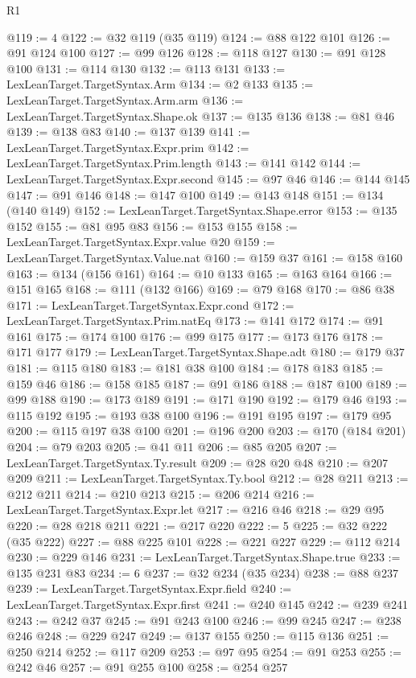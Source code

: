 \begin{lexlean}{R1}
\begin{coremodule}
{{{{{{{{{{{{{{{{{{{{{{{{{{{{{{{{{{{{{{{{{{{{{{{{{{{{{{{{{@119 := 4
@122 := @32 @119 (@35 @119)
@124 := @88 @122 @101
@126 := @91 @124 @100
@127 := @99 @126
@128 := @118 @127
@130 := @91 @128 @100
@131 := @114 @130
@132 := @113 @131
@133 := LexLeanTarget.TargetSyntax.Arm
@134 := @2 @133
@135 := LexLeanTarget.TargetSyntax.Arm.arm
@136 := LexLeanTarget.TargetSyntax.Shape.ok
@137 := @135 @136
@138 := @81 @46
@139 := @138 @83
@140 := @137 @139
@141 := LexLeanTarget.TargetSyntax.Expr.prim
@142 := LexLeanTarget.TargetSyntax.Prim.length
@143 := @141 @142
@144 := LexLeanTarget.TargetSyntax.Expr.second
@145 := @97 @46
@146 := @144 @145
@147 := @91 @146
@148 := @147 @100
@149 := @143 @148
@151 := @134 (@140 @149)
@152 := LexLeanTarget.TargetSyntax.Shape.error
@153 := @135 @152
@155 := @81 @95 @83
@156 := @153 @155
@158 := LexLeanTarget.TargetSyntax.Expr.value @20
@159 := LexLeanTarget.TargetSyntax.Value.nat
@160 := @159 @37
@161 := @158 @160
@163 := @134 (@156 @161)
@164 := @10 @133
@165 := @163 @164
@166 := @151 @165
@168 := @111 (@132 @166)
@169 := @79 @168
@170 := @86 @38
@171 := LexLeanTarget.TargetSyntax.Expr.cond
@172 := LexLeanTarget.TargetSyntax.Prim.natEq
@173 := @141 @172
@174 := @91 @161
@175 := @174 @100
@176 := @99 @175
@177 := @173 @176
@178 := @171 @177
@179 := LexLeanTarget.TargetSyntax.Shape.adt
@180 := @179 @37
@181 := @115 @180
@183 := @181 @38 @100
@184 := @178 @183
@185 := @159 @46
@186 := @158 @185
@187 := @91 @186
@188 := @187 @100
@189 := @99 @188
@190 := @173 @189
@191 := @171 @190
@192 := @179 @46
@193 := @115 @192
@195 := @193 @38 @100
@196 := @191 @195
@197 := @179 @95
@200 := @115 @197 @38 @100
@201 := @196 @200
@203 := @170 (@184 @201)
@204 := @79 @203
@205 := @41 @11
@206 := @85 @205
@207 := LexLeanTarget.TargetSyntax.Ty.result
@209 := @28 @20 @48
@210 := @207 @209
@211 := LexLeanTarget.TargetSyntax.Ty.bool
@212 := @28 @211
@213 := @212 @211
@214 := @210 @213
@215 := @206 @214
@216 := LexLeanTarget.TargetSyntax.Expr.let
@217 := @216 @46
@218 := @29 @95
@220 := @28 @218 @211
@221 := @217 @220
@222 := 5
@225 := @32 @222 (@35 @222)
@227 := @88 @225 @101
@228 := @221 @227
@229 := @112 @214
@230 := @229 @146
@231 := LexLeanTarget.TargetSyntax.Shape.true
@233 := @135 @231 @83
@234 := 6
@237 := @32 @234 (@35 @234)
@238 := @88 @237
@239 := LexLeanTarget.TargetSyntax.Expr.field
@240 := LexLeanTarget.TargetSyntax.Expr.first
@241 := @240 @145
@242 := @239 @241
@243 := @242 @37
@245 := @91 @243 @100
@246 := @99 @245
@247 := @238 @246
@248 := @229 @247
@249 := @137 @155
@250 := @115 @136
@251 := @250 @214
@252 := @117 @209
@253 := @97 @95
@254 := @91 @253
@255 := @242 @46
@257 := @91 @255 @100
@258 := @254 @257
}}}}}}}}}}}}}}}}}}}}}}}}}}}}}}}}}}}}}}}}}}}}}}}}}}}}}}}}}
\end{coremodule}
\end{lexlean}
